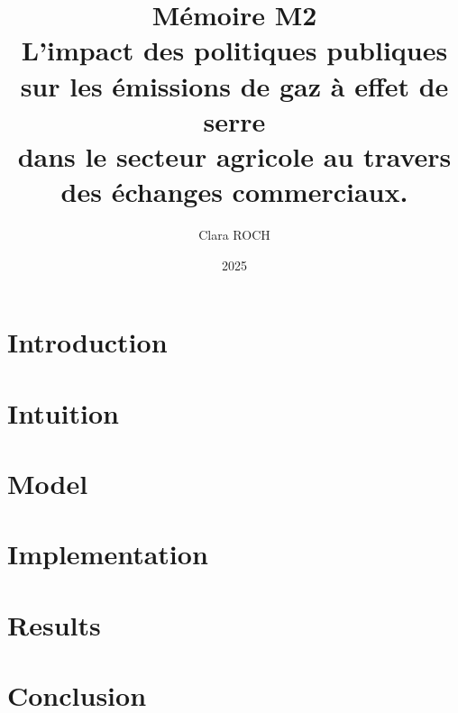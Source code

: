 \documentclass[10pt,twoside]{report}
\title{%
    Mémoire M2 \\
    \large L'impact des politiques publiques sur les émissions de gaz à effet de serre \\ dans le secteur agricole au travers des échanges commerciaux.}
\author{Clara ROCH}
\date{2025}
\begin{document}
\maketitle
\tableofcontents

\chapter{Introduction}


\chapter{Intuition}\label{intuition}


\chapter{Model}\label{model}


\chapter{Implementation}\label{data}


\chapter{Results}\label{results}


\chapter{Conclusion}


\appendix

\end{document}
